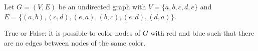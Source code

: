 \begin{prob}
    Let $G=(V,E)$ be an undirected graph with $V=\{a,b,c,d,e\}$ and $E=\{(a,b),(c,d),(e,a),(b,c),(e,d),(d,a)\}$. 

    True or False: it
    is possible to color nodes of $G$ with red and blue such that there are no edges between nodes of the same color.

    \tF{}
\end{prob}